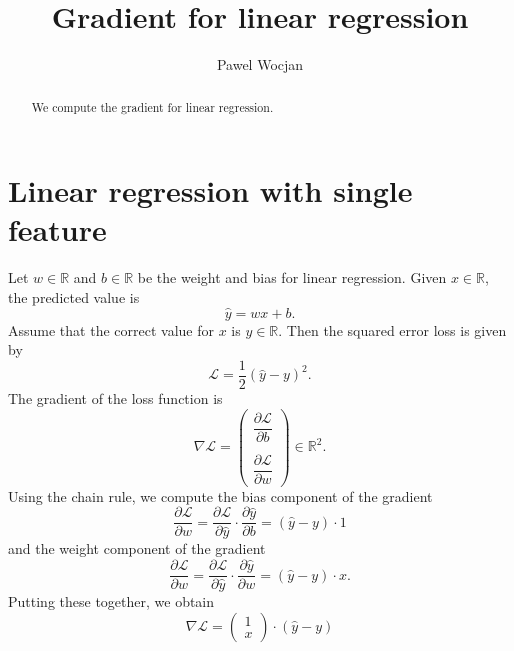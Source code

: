\documentclass[12pt]{article}
\title{Gradient for linear regression}
\author{Pawel Wocjan}
\newcommand{\R}{\mathbb{R}}
\begin{document}
\maketitle


\begin{abstract}
We compute the gradient for linear regression.
\end{abstract}

\section{Linear regression with single feature}

Let $w\in\R$ and $b\in\R$ be the weight and bias for linear regression.  Given $x\in\R$, the predicted value is
\begin{equation}
\hat{y} = w x + b.
\end{equation}
Assume that the correct value for $x$ is $y\in \R$.  Then the squared error loss is given by
\begin{equation}
\mathcal{L} = \frac{1}{2}(\hat{y}-y)^2.
\end{equation}
The gradient of the loss function is 
\begin{equation}
\nabla\mathcal{L} = \left(
\begin{array}{c}
\dfrac{\partial \mathcal{L}}{\partial b}  \\
\\
\dfrac{\partial \mathcal{L}}{\partial w} 
\end{array}
\right)\in \R^2.
\end{equation}
Using the chain rule, we compute the bias component of the gradient
\begin{equation}
\dfrac{\partial \mathcal{L}}{\partial w} =
\dfrac{\partial \mathcal{L}}{\partial\hat{y}} \cdot \dfrac{\partial \hat{y}}{\partial b} =
(\hat{y} - y) \cdot 1 
\end{equation}
and the weight component of the gradient
\begin{equation}
\dfrac{\partial \mathcal{L}}{\partial w} =
\dfrac{\partial \mathcal{L}}{\partial\hat{y}} \cdot \dfrac{\partial \hat{y}}{\partial w} =
(\hat{y} - y) \cdot x.
\end{equation}
Putting these together, we obtain
\begin{equation}
\nabla\mathcal{L} = 
\left(
\begin{array}{c}
1 \\
x 
\end{array}
\right)
\cdot 
(\hat{y}-y)
\end{equation}
\end{document}

